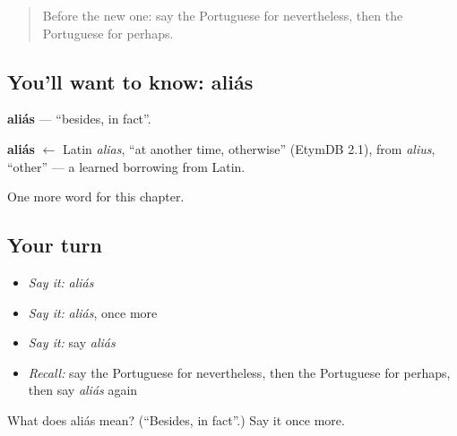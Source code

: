 \label{lesson:PT-C214-alias}



\begin{quote}
Before the new one: say the Portuguese for nevertheless, then the Portuguese for perhaps.
\end{quote}

\subsection*{You'll want to know: aliás}
\textbf{aliás} — \textquotedblleft{}besides, in fact\textquotedblright{}.

\begin{cousinweb}
\textbf{aliás} $\leftarrow$ Latin \emph{alias}, \textquotedblleft{}at another time, otherwise\textquotedblright{} (EtymDB 2.1), from \emph{alius}, \textquotedblleft{}other\textquotedblright{} — a learned borrowing from Latin.
\end{cousinweb}

\begin{grammarlens}[title={What you've built}]
One more word for this chapter.
\end{grammarlens}

\subsection*{Your turn}
\begin{itemize}
\raggedright
  \item \emph{Say it:} \emph{aliás}
  \item \emph{Say it:} \emph{aliás}, once more
  \item \emph{Say it:} say \emph{aliás}
  \item \emph{Recall:} say the Portuguese for nevertheless, then the Portuguese for perhaps, then say \emph{aliás} again
\end{itemize}

\begin{tcolorbox}[breakable,colback=teal!4,colframe=teal!35!black,title={Before you move on}]
What does aliás mean? (\textquotedblleft{}Besides, in fact\textquotedblright{}.) Say it once more.
\end{tcolorbox}
